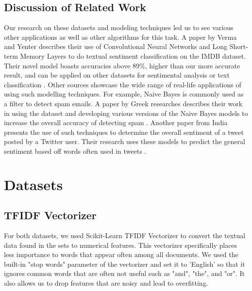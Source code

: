 \documentclass[11pt]{homework}
\begin{document}
\subsection{Discussion of Related Work}
Our research on these datasets and modeling techniques led us to see various other applications as well as other algorithms for this task. A paper by Verma and Yenter describes their use of Convolutional Neural Networks and Long Short-term Memory Layers to do textual sentiment classification on the IMDB dataset. Their novel model boasts accuracies above 89\%, higher than our more accurate result, and can be applied on other datasets for sentimental analysis or text classification \cite{yenter2017deep}. Other sources showcase the wide range of real-life applications of using such modelling techniques. For example, Naive Bayes is commonly used as a filter to detect spam emails. A paper by Greek researches describes their work in using the dataset and developing various versions of the Naive Bayes models to increase the overall accuracy of detecting spam \cite{metsis2006spam}. Another paper from India presents the use of such techniques to determine the overall sentiment of a tweet posted by a Twitter user. Their research uses these models to predict the general sentiment based off words often used in tweets \cite{vadivukarassi2017sentimental}.

\section{Datasets}

\subsection{TFIDF Vectorizer}\label{TFDIF Vectorizer}
For both datasets, we used Scikit-Learn TFIDF Vectorizer to convert the textual data found in the sets to numerical features. This vectorizer specifically places less importance to words that appear often among all documents. We used the built-in "stop words" parameter of the vectorizer and set it to 'English' so that it ignores common words that are often not useful such as "and", "the", and "or". It also allows us to drop features that are noisy and lead to overfitting.
\end{document}

